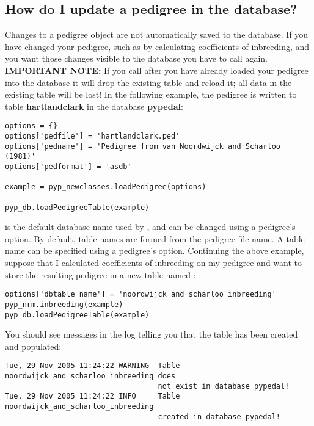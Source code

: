 \subsection{How do I update a pedigree in the database?}
\label{sec:howto-pedigree-db-update-table}
Changes to a \PyPedal{} pedigree object are not automatically saved to the database.  If you have changed
your pedigree, such as by calculating coefficients of inbreeding, and you want those changes visible to the
database you have to call  again.  \textbf{IMPORTANT NOTE:} If you call
 after you have already loaded your pedigree into the database it will
drop the existing table and reload it; all data in the existing table will be lost!  In the following
example, the pedigree is written to table \textbf{hartlandclark} in the database \textbf{pypedal}:
\begin{verbatim}
options = {}
options['pedfile'] = 'hartlandclark.ped'
options['pedname'] = 'Pedigree from van Noordwijck and Scharloo (1981)'
options['pedformat'] = 'asdb'

example = pyp_newclasses.loadPedigree(options)

pyp_db.loadPedigreeTable(example)
\end{verbatim}
 is the default database name used by \PyPedal{}, and can be changed using a pedigree's  option.  By default, table names are formed from the pedigree file name.  A table name can be specified using a pedigree's  option.  Continuing the above example, suppose that I calculated coefficients of inbreeding on my pedigree and want to store the resulting pedigree in a new table named :
\begin{verbatim}
options['dbtable_name'] = 'noordwijck_and_scharloo_inbreeding'
pyp_nrm.inbreeding(example)
pyp_db.loadPedigreeTable(example)
\end{verbatim}
You should see messages in the log telling you that the table has been created and populated:
\begin{verbatim}
Tue, 29 Nov 2005 11:24:22 WARNING  Table noordwijck_and_scharloo_inbreeding does
                                   not exist in database pypedal!
Tue, 29 Nov 2005 11:24:22 INFO     Table noordwijck_and_scharloo_inbreeding
                                   created in database pypedal!
\end{verbatim}
